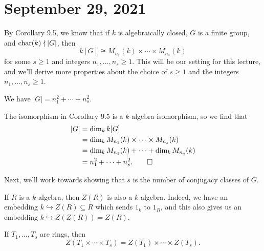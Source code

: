 \section{September 29, 2021}
By Corollary 9.5, we know that if $k$ is algebraically closed, $G$ 
is a finite group, and $\operatorname{char}(k) \nmid |G|$, then 
\[ k[G] \cong M_{n_1}(k) \times \cdots \times M_{n_s}(k) \] 
for some $s \geq 1$ and integers $n_1, \dots, n_s \geq 1$. 
This will be our setting for this lecture, and
we'll derive more properties about the choice of $s \geq 1$ and the integers 
$n_1, \dots, n_s \geq 1$. 

\begin{thm}
    We have $|G| = n_1^2 + \cdots + n_s^2$. 
\end{thm}
\begin{pf}
    The isomorphism in Corollary 9.5 is a $k$-algebra isomorphism, so we 
    find that 
    \begin{align*}
        |G| &= \dim_k k[G] \\
        &= \dim_k M_{n_1}(k) \times \cdots \times M_{n_s}(k) \\
        &= \dim_k M_{n_1}(k) + \cdots + \dim_k M_{n_s}(k) \\
        &= n_1^2 + \cdots + n_s^2. \qedhere 
    \end{align*}
\end{pf}

Next, we'll work towards showing that $s$ is the number of conjugacy classes of $G$.

\begin{remark}
    If $R$ is a $k$-algebra, then $Z(R)$ is also a $k$-algebra. Indeed, we have
    an embedding $k \hookrightarrow Z(R) \subseteq R$ which sends $1_k$ 
    to $1_R$, and this also gives us an embedding $k \hookrightarrow 
    Z(Z(R)) = Z(R)$. 
\end{remark}

\begin{remark}
    If $T_1, \dots, T_s$ are rings, then 
    \[ Z(T_1 \times \cdots \times T_s) = Z(T_1) \times \cdots \times Z(T_s). \]
\end{remark}

